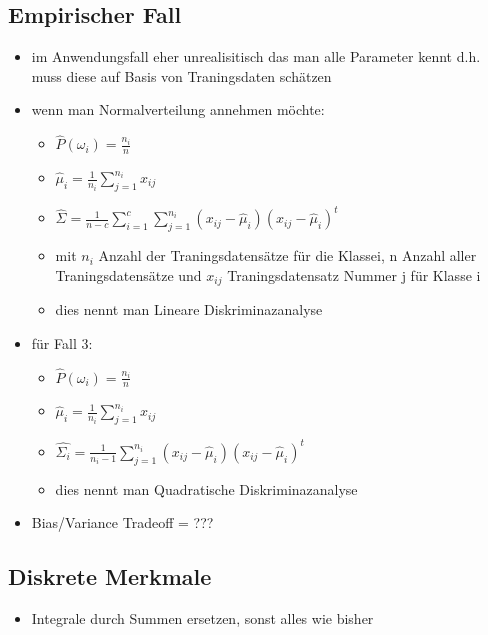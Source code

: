 \documentclass{article} %
\begin{document}
	\subsection{Empirischer Fall}
	\begin{itemize}
		\item im Anwendungsfall eher unrealisitisch das man alle Parameter kennt d.h. muss diese auf Basis von Traningsdaten schätzen
		\item wenn man Normalverteilung annehmen möchte:
		\begin{itemize}
			\item $\hat{P}(\omega_i) = \frac{n_i}{n}$
			\item $\hat{\mu}_i = \frac{1}{n_i}\sum_{j=1}^{n_i} x_{ij}$
			\item $\hat{\Sigma} = \frac{1}{n-c}\sum_{i=1}^{c}\sum_{j=1}^{n_i}(x_{ij}-\hat{\mu}_i)(x_{ij}-\hat{\mu}_i)^t$
			\item mit $n_i$ Anzahl der Traningsdatensätze für die Klassei, n Anzahl aller Traningsdatensätze und $x_{ij}$ Traningsdatensatz Nummer j für Klasse i
			\item dies nennt man Lineare Diskriminazanalyse
		\end{itemize}
		\item für Fall 3:
		\begin{itemize}
			\item $\hat{P}(\omega_i) = \frac{n_i}{n}$
			\item $\hat{\mu}_i = \frac{1}{n_i}\sum_{j=1}^{n_i} x_{ij}$
			\item $\hat{\Sigma_i} = \frac{1}{n_i-1}\sum_{j=1}^{n_i}(x_{ij}-\hat{\mu}_i)(x_{ij}-\hat{\mu}_i)^t$
			\item dies nennt man Quadratische Diskriminazanalyse
		\end{itemize}
		\item Bias/Variance Tradeoff = ???
	\end{itemize}
	\subsection{Diskrete Merkmale}
	\begin{itemize}
		\item Integrale durch Summen ersetzen, sonst alles wie bisher
	\end{itemize}


\end{document}
